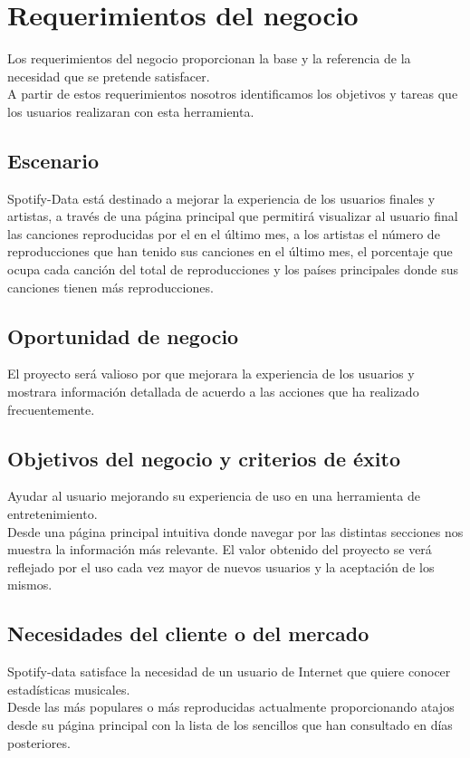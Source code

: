 \documentclass[12pt,a4paper]{book}
\begin{document}
\chapter{Requerimientos del negocio}
Los requerimientos del negocio proporcionan la base y la referencia de la necesidad que se pretende satisfacer.\\
A partir de estos requerimientos nosotros identificamos los objetivos y tareas que los usuarios realizaran con esta herramienta.
\section{Escenario}
\vspace{0.5 cm}
Spotify-Data está destinado a mejorar la experiencia de los usuarios finales y artistas, a través de una página principal que permitirá visualizar al usuario final las canciones reproducidas por el en el último mes, a los artistas el número de reproducciones que han tenido sus canciones en el último mes, el porcentaje que ocupa cada canción del total de reproducciones y los países principales donde sus canciones tienen más reproducciones.
\section{Oportunidad de negocio}
\vspace{0.5 cm}
El proyecto será valioso por que mejorara la experiencia de los usuarios y mostrara información detallada de acuerdo a las acciones que ha realizado frecuentemente.
\section{Objetivos del negocio y criterios de éxito}
\vspace{0.5 cm}
Ayudar al usuario mejorando su experiencia de uso en una herramienta de entretenimiento.\\ 
Desde una página principal intuitiva donde navegar por las distintas secciones nos muestra la información más relevante. 
El valor obtenido del proyecto se verá reflejado por el uso cada vez mayor de nuevos usuarios y la aceptación de los mismos.
\newpage
\vspace{0.5 cm}
\section{Necesidades del cliente o del mercado}
\vspace{0.5 cm}
Spotify-data satisface la necesidad de un usuario de Internet que quiere conocer estadísticas musicales.\\
Desde las más populares o más reproducidas actualmente proporcionando atajos desde su página principal con la lista de los sencillos que han consultado en días posteriores.\\
\end{document}
